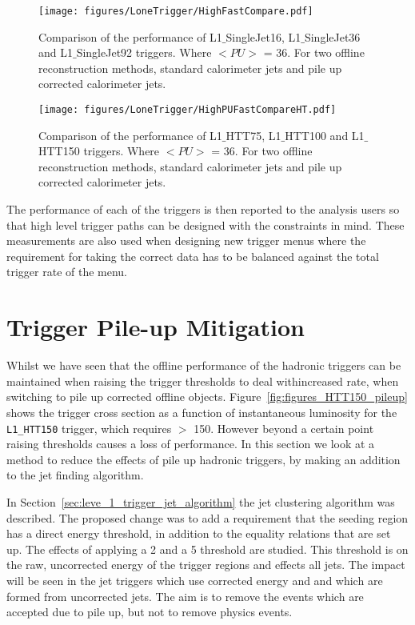\begin{figure}[htbp]
  \centering
    \texttt{[image: figures/LoneTrigger/HighFastCompare.pdf]}
  \caption{Comparison of the performance of L1$\_$SingleJet16, L1$\_$SingleJet36 and L1$\_$SingleJet92 triggers. Where $<PU>$ = 36. For two offline reconstruction methods, standard \AK calorimeter jets and pile up corrected \AK calorimeter jets.}
  \label{fig:figures_LoneTrigger_HighFastCompare}
\end{figure}

\begin{figure}[htbp]
  \centering
    \texttt{[image: figures/LoneTrigger/HighPUFastCompareHT.pdf]}
  \caption{Comparison of the performance of  L1$\_$HTT75, L1$\_$HTT100 and  L1$\_$HTT150 triggers. Where $<PU>$ = 36. For two offline reconstruction methods, standard \AK calorimeter jets and pile up corrected \AK calorimeter jets.}
  \label{fig:figures_LoneTrigger_HighPUFastCompareHT}
\end{figure}

The performance of each of the \Lone triggers is then reported to the analysis 
users so that high level trigger paths can be designed with the \Lone 
constraints in mind. These measurements are also used when designing new \Lone 
trigger menus where the requirement for taking the correct data has to be 
balanced against the total trigger rate of the \Lone menu.

\clearpage
\section{\Lone Trigger Pile-up Mitigation} %
\label{sub:lone_trigger_pile_up_mitigation}


Whilst we have seen that the offline performance of the \Lone hadronic triggers 
can be maintained when raising the trigger thresholds to deal withincreased 
rate, when switching to pile up corrected offline objects. 
Figure~\ref{fig:figures_HTT150_pileup} shows the trigger cross section as a 
function of instantaneous luminosity for the \verb|L1_HTT150| trigger, which 
requires \HT $>$ \unit{150}{\GeV}. However beyond a certain point raising 
thresholds causes a loss of performance.
In this section we look at a method to reduce the effects of pile up hadronic 
\Lone triggers, by making an addition to the \Lone jet finding algorithm.

In Section~\ref{sec:leve_1_trigger_jet_algorithm} the \Lone jet clustering 
algorithm was described. The proposed change was to add a requirement that the 
seeding region has a direct energy threshold, in addition to the equality 
relations that are set up. The effects of applying a \unit{2}{\GeV} and a 
\unit{5}{\GeV} threshold are studied. This threshold is on the raw, uncorrected 
energy of the trigger regions and effects all \Lone jets. The impact will be 
seen in the \Lone jet triggers which use corrected energy and \Lone \HT and 
\HTm which are formed from uncorrected jets.
The aim is to remove the events which are accepted due to pile up, but not to 
remove physics events.

